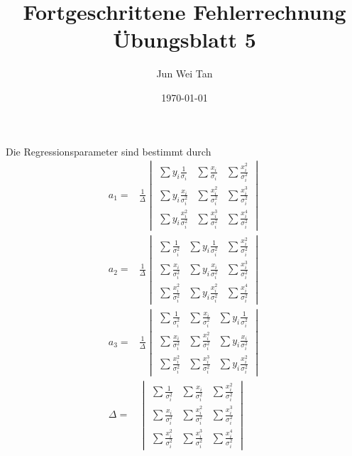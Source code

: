 \documentclass[prb,12pt]{revtex4-2}
\theoremstyle{definition}
\theoremstyle{definition}
\begin{document}
\title{Fortgeschrittene Fehlerrechnung Übungsblatt 5}
	\author{Jun Wei Tan}
	\date{\today}
	\maketitle
Die Regressionsparameter sind bestimmt durch
\begin{align*}
	a_1=&\frac 1\Delta \begin{vmatrix}
		\sum y_i \frac{1}{\sigma_i} & \sum \frac{x_i}{\sigma_i} & \sum \frac{x_i^2}{\sigma_i^2} \\ 
		\sum y_i \frac{x_i}{\sigma_i^2} & \sum \frac{x_i^2}{\sigma_i^2} & \sum \frac{x_i^3}{\sigma_i^2} \\
		\sum y_i \frac{x_i^2}{\sigma_i^2} & \sum \frac{x_i^3}{\sigma_i^2} & \sum \frac{x_i^4}{\sigma_i^2}
	\end{vmatrix}\\
a_2=&\frac 1\Delta \begin{vmatrix}
	\sum \frac{1}{\sigma_i^2} & \sum y_i \frac{1}{\sigma_i^2} & \sum \frac{x_i^2}{\sigma_i^2} \\
	\sum \frac{x_i}{\sigma_i^2} & \sum y_i \frac{x_i}{\sigma_i^2} & \sum \frac{x_i^3}{\sigma_i^2} \\
	\sum \frac{x_i^2}{\sigma_i^2} & \sum y_i\frac{x_i^2}{\sigma_i^2} & \sum \frac{x_i^4}{\sigma_i^2}
\end{vmatrix}\\
a_3=& \frac 1\Delta \begin{vmatrix}
	\sum \frac{1}{\sigma_i^2} & \sum\frac{x_i}{\sigma_i^2} & \sum y_i \frac{1}{\sigma_i^2}\\
	\sum \frac{x_i}{\sigma_i^2} & \sum\frac{x_i^2}{\sigma_i^2} & \sum y_i\frac{x_i}{\sigma_i^2} \\
	\sum \frac{x_i^2}{\sigma_i^2} & \sum \frac{x_i^3}{\sigma_i^2} & \sum y_i \frac{x_i^2}{\sigma_i^2}
\end{vmatrix}\\
\Delta=&\begin{vmatrix}
	\sum \frac{1}{\sigma_i^2} & \sum \frac{x_i}{\sigma_i^2} & \sum \frac{x_i^2}{\sigma_i^2} \\ \sum \frac{x_i}{\sigma_i^2} & \sum \frac{x_i^2}{\sigma_i^2} & \sum\frac{x_i^3}{\sigma_i^2} \\
	\sum \frac{x_i^2}{\sigma_i^2} & \sum \frac{x_i^3}{\sigma_i^2} & \sum\frac{x_i^4}{\sigma_i^2}
\end{vmatrix}
\end{align*}
\end{document}
